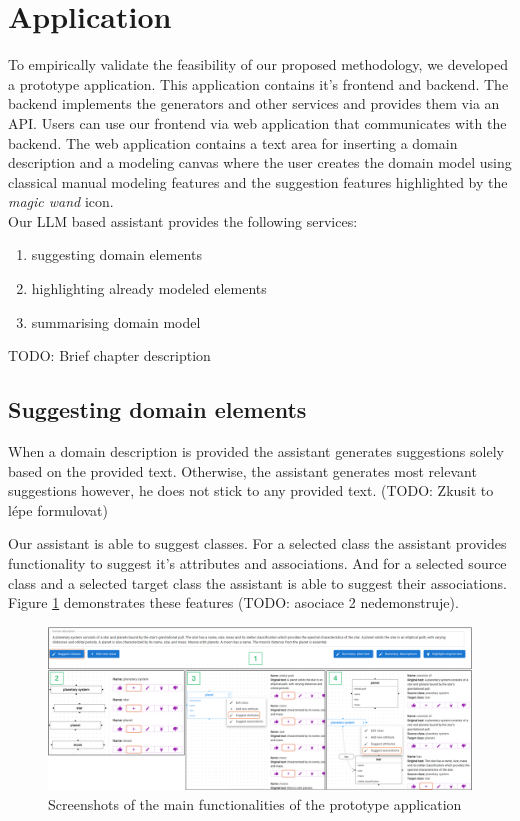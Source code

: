 \section{Application}

To empirically validate the feasibility of our proposed methodology, we developed a prototype application. This application contains it's frontend and backend. The backend  implements the generators and other services and provides them via an API. Users can use our frontend via web application that communicates with the backend. The web application contains a text area for inserting a domain description and a modeling canvas where the user creates the domain model using classical manual modeling features and the suggestion features highlighted by the \textit{magic wand} icon. \\

Our LLM based assistant provides the following services:
\begin{enumerate}
\item suggesting domain elements
\item highlighting already modeled elements
\item summarising domain model \\
\end{enumerate}

TODO: Brief chapter description \\


\subsection{Suggesting domain elements}

When a domain description is provided the assistant generates suggestions solely based on the provided text. Otherwise, the assistant generates most relevant suggestions however, he does not stick to any provided text. (TODO: Zkusit to lépe formulovat)

Our assistant is able to suggest classes. For a selected class the assistant provides functionality to suggest it's attributes and associations. And for a selected source class and a selected target class the assistant is able to suggest their associations. Figure \ref{fig:assistant-features} demonstrates these features (TODO: asociace 2 nedemonstruje).

\begin{figure}[!h]
    \centering
    \includegraphics[scale=0.22]{img/assistant-features.png}
    \caption{\centering Screenshots of the main functionalities of the prototype application}
    \label{fig:assistant-features}
\end{figure}

